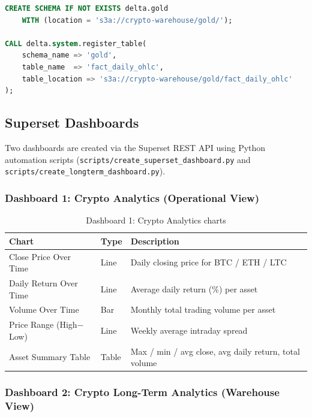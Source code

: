 \documentclass[a4paper]{article}
\begin{document}
\begin{lstlisting}[language=SQL]
CREATE SCHEMA IF NOT EXISTS delta.gold
    WITH (location = 's3a://crypto-warehouse/gold/');

CALL delta.system.register_table(
    schema_name => 'gold',
    table_name  => 'fact_daily_ohlc',
    table_location => 's3a://crypto-warehouse/gold/fact_daily_ohlc'
);
\end{lstlisting}

\subsection{Superset Dashboards}

Two dashboards are created via the Superset REST API using Python automation
scripts (\texttt{scripts/create\_superset\_dashboard.py} and
\texttt{scripts/create\_longterm\_dashboard.py}).

\subsubsection{Dashboard 1: Crypto Analytics (Operational View)}

\begin{table}[H]
\centering
\begin{tabular}{|l|l|p{7cm}|}
\hline
\textbf{Chart} & \textbf{Type} & \textbf{Description} \\
\hline
Close Price Over Time & Line & Daily closing price for BTC / ETH / LTC \\
\hline
Daily Return Over Time & Line & Average daily return (\%) per asset \\
\hline
Volume Over Time & Bar & Monthly total trading volume per asset \\
\hline
Price Range (High$-$Low) & Line & Weekly average intraday spread \\
\hline
Asset Summary Table & Table & Max / min / avg close, avg daily return, total volume \\
\hline
\end{tabular}
\caption{Dashboard 1: Crypto Analytics charts}
\end{table}

\subsubsection{Dashboard 2: Crypto Long-Term Analytics (Warehouse View)}
\end{document}
